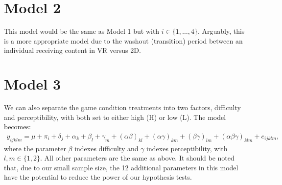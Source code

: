 \documentclass[hidelinks]{article}
\begin{document}
\section{Model 2}

This model would be the same as Model 1 but with $i \in \{1, \dots, 4\}$. Arguably, this is a more appropriate model due to the washout (transition) period between an individual receiving content in VR versus 2D. 

\section{Model 3}

We can also separate the game condition treatments into two factors, difficulty and perceptibility, with both set to either high (H) or low (L). The model becomes: 
\begin{align*}
	y_{ijklm} = \mu + \pi_i + \delta_j + \alpha_k + \beta_{l} + \gamma_m + 
		(\alpha \beta)_{kl} + (\alpha \gamma)_{km} + (\beta \gamma)_{lm} + 
		(\alpha \beta \gamma)_{klm} + e_{ijklm},
\end{align*}
where the parameter $\beta$ indexes difficulty and $\gamma$ indexes perceptibility, with $l, m \in \{1, 2\}$. All other parameters are the same as above. It should be noted that, due to our small sample size, the 12 additional parameters in this model have the potential to reduce the power of our hypothesis tests. 
\end{document}
